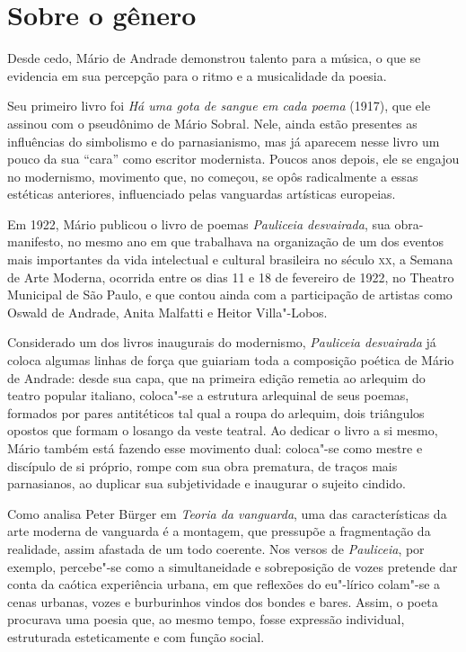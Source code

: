 
\section{Sobre o gênero}

Desde cedo, Mário de Andrade demonstrou talento para a música, o que se evidencia em sua percepção para o ritmo e a musicalidade da poesia.

Seu primeiro livro foi \emph{Há uma gota de sangue em cada poema}
(1917), que ele assinou com o pseudônimo de Mário Sobral. Nele, ainda
estão presentes as influências do simbolismo e do parnasianismo, mas já
aparecem nesse livro um pouco da sua ``cara'' como escritor modernista.
Poucos anos depois, ele se engajou no modernismo, movimento que, no
começou, se opôs radicalmente a essas estéticas anteriores, influenciado
pelas vanguardas artísticas europeias.

Em 1922, Mário publicou o livro de poemas \emph{Pauliceia desvairada},
sua obra-manifesto, no mesmo ano em que trabalhava na organização de um
dos eventos mais importantes da vida intelectual e cultural brasileira
no século \textsc{xx}, a Semana de Arte Moderna, ocorrida entre os dias 11 e 18
de fevereiro de 1922, no Theatro Municipal de São Paulo, e que contou
ainda com a participação de artistas como Oswald de Andrade, Anita
Malfatti e Heitor Villa"-Lobos.

Considerado um dos livros inaugurais do modernismo, \emph{Pauliceia desvairada}
já coloca algumas linhas de força que guiariam toda a composição poética de Mário de Andrade: desde sua capa, que na primeira edição remetia ao arlequim do teatro popular italiano, coloca"-se a estrutura arlequinal de seus poemas, formados por pares antitéticos tal qual a roupa do arlequim, dois triângulos opostos que formam o losango da veste teatral. Ao dedicar o livro a si mesmo, Mário também está fazendo esse movimento dual: coloca"-se como mestre e discípulo de si próprio, rompe com sua obra prematura, de traços mais parnasianos, ao duplicar sua subjetividade e inaugurar o sujeito cindido.

Como analisa Peter Bürger em \textit{Teoria da vanguarda}, uma das características da arte moderna de vanguarda é a montagem, que pressupõe a fragmentação da realidade, assim afastada de um todo coerente. Nos versos de \textit{Pauliceia}, por exemplo, percebe"-se como a simultaneidade e sobreposição de vozes pretende dar conta da caótica experiência urbana, em que reflexões do eu"-lírico colam"-se a cenas urbanas, vozes e burburinhos vindos dos bondes e bares.
Assim, o poeta procurava uma poesia que, ao mesmo tempo, fosse expressão individual, estruturada esteticamente e com função social.


